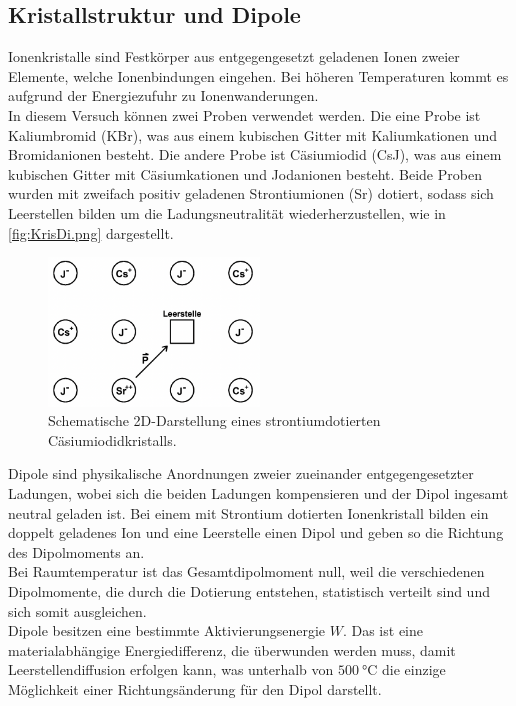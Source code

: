 \subsection{Kristallstruktur und Dipole}
\label{subsec:KriDi}
Ionenkristalle sind Festkörper aus entgegengesetzt geladenen Ionen zweier Elemente, welche Ionenbindungen eingehen.
Bei höheren Temperaturen kommt es aufgrund der Energiezufuhr zu Ionenwanderungen.\\
In diesem Versuch können zwei Proben verwendet werden. Die eine Probe ist Kaliumbromid (KBr), was aus einem kubischen Gitter
mit Kaliumkationen und Bromidanionen besteht. Die andere Probe ist Cäsiumiodid (CsJ), was aus einem kubischen
Gitter mit Cäsiumkationen und Jodanionen besteht. Beide Proben wurden mit zweifach positiv geladenen Strontiumionen (Sr) dotiert, sodass sich
Leerstellen bilden um die Ladungsneutralität wiederherzustellen, wie in \autoref{fig:KrisDi.png} dargestellt.
\begin{figure}[H]
    \centering
    \includegraphics[width=0.5\textwidth]{Abbildungen/KrisDi.png}
    \caption {Schematische 2D-Darstellung eines strontiumdotierten Cäsiumiodidkristalls.}
    \label{fig:KrisDi.png}
\end{figure}
Dipole sind physikalische Anordnungen zweier zueinander entgegengesetzter Ladungen, wobei sich die beiden Ladungen
kompensieren und der Dipol ingesamt neutral geladen ist.
Bei einem mit Strontium dotierten Ionenkristall bilden ein doppelt geladenes Ion und eine Leerstelle einen Dipol und geben so die 
Richtung des Dipolmoments an.\\
Bei Raumtemperatur ist das Gesamtdipolmoment null, weil die verschiedenen Dipolmomente, die durch die Dotierung 
entstehen, statistisch verteilt sind und sich somit ausgleichen.\\
Dipole besitzen eine bestimmte Aktivierungsenergie $W$. Das ist eine materialabhängige Energiedifferenz, die 
überwunden werden muss, damit Leerstellendiffusion erfolgen kann, was unterhalb von $\qty{500}{\celsius}$ die einzige Möglichkeit
einer Richtungsänderung für den Dipol darstellt.
